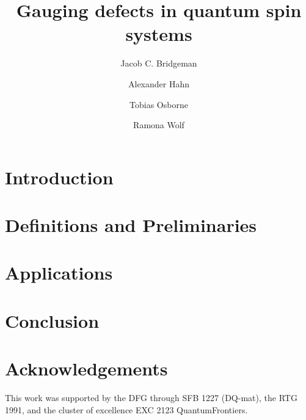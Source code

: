 
\title{Gauging defects in quantum spin systems}
\author{Jacob C. Bridgeman}
\author{Alexander Hahn}
\author{Tobias Osborne}
\author{Ramona Wolf}




\maketitle

\begin{abstract}
	
\end{abstract}

\section{Introduction}


\section{Definitions and Preliminaries}





\section{Applications}



\section{Conclusion}

\section*{Acknowledgements}
This work was supported by the DFG through SFB 1227 (DQ-mat), the RTG 1991, and the cluster of excellence EXC 2123 QuantumFrontiers.



